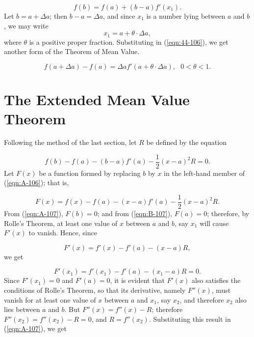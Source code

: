 \begin{equation}
f(b) = f(a) + (b - a)f'(x_1).
\label{eqn:106-45}
\end{equation}
Let $b = a + \Delta a$; then $b - a = \Delta a$, and since $x_1$ is a 
number lying between $a$ and $b$, we may write
\[
  	x_1 = a + \theta \cdot \Delta a,
\]
where $\theta$ is a positive proper fraction. Substituting 
in (\ref{eqn:44-106}), we get another form of the 
Theorem of Mean Value.

\begin{equation}
f(a + \Delta a) - f(a) = \Delta a f'(a + \theta \cdot \Delta a),
\ \ \ 0 < \theta < 1.
\label{eqn:46-106}
\end{equation}

\section{The Extended Mean Value Theorem}
\label{sec:107}

Following the method of the last section, 
let $R$ be defined by the equation

\begin{equation}
f(b) - f(a) - (b - a)f'(a) - \frac{1}{2} (x - a)^2R = 0.
\label{eqn:A-107}
\end{equation}
Let $F(x)$ be a function formed by replacing $b$ by $x$ in the 
left-hand member of (\ref{eqn:A-106}); that is,

\begin{equation}
F(x) = f(x) - f(a) - (x - a) f'(a) - \frac{1}{2} (x - a)^2 R.
\label{eqn:B-107}
\end{equation}
From (\ref{eqn:A-107}), $F(b) = 0$; and from (\ref{eqn:B-107}), 
$F(a) = 0$; therefore, by Rolle's Theorem, %
at least one value of $x$ 
between $a$ and $b$, say $x_1$ will cause 
$F'(x)$ to vanish. Hence, since

\[
F'(x) = f'(x) - f'(a) - (x - a)R, 
\]
we get

\[
F'(x_1) = f'(x_1) - f'(a) - (x_1 - a)R = 0.
\]
Since $F'(x_1) = 0$ and $F'(a) = 0$, it is evident that $F'(x)$ 
also satisfies the conditions of Rolle's Theorem, so that 
its derivative, namely $F''(x)$, must vanish for at least one 
value of $x$ between $a$ and $x_1$, say $x_2$, and therefore 
$x_2$ also lies between $a$ and $b$. But
$F''(x) = f''(x) - R$; 
therefore $F''(x_2) = f''(x_2) - R = 0$,
and $R = f''(x_2)$.
Substituting this result in (\ref{eqn:A-107}), we get

